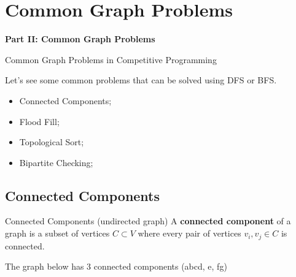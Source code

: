
\section{Common Graph Problems}

\begin{frame}{}
  \begin{center}
    {\bf Part II: Common Graph Problems}
  \end{center}
\end{frame}

\begin{frame}{Common Graph Problems in Competitive Programming}

  Let's see some common problems that can be solved using DFS or BFS.\bigskip

  \begin{itemize}
    \item Connected Components;
    \item Flood Fill;
    \item Topological Sort;
    \item Bipartite Checking;
  \end{itemize}
\end{frame}


\subsection{Connected Components}
\begin{frame}{Connected Components (undirected graph)}
  A {\bf connected component} of a graph is a subset of vertices $C \subset V$ where every pair of vertices $v_i, v_j \in C$ is connected.\bigskip

  The graph below has 3 connected components (abcd, e, fg)\bigskip


  \vfill
  \begin{center}
  \end{center}
\end{frame}

